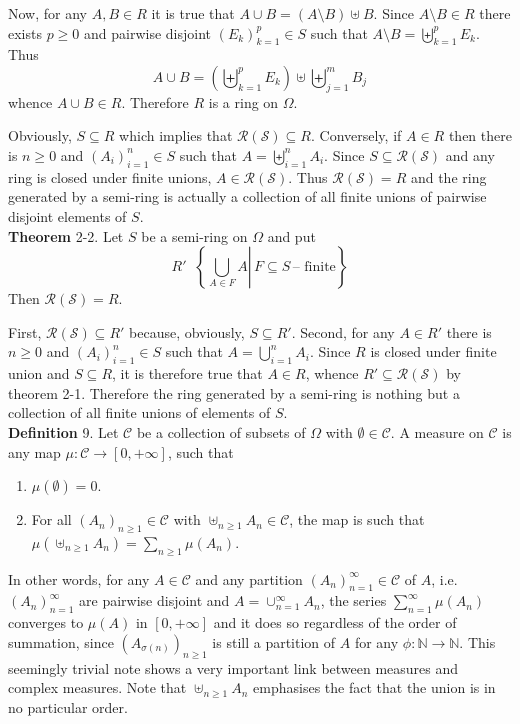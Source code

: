 \documentclass[a4paper]{article}
\newcommand{\obj}[1]{\left\{ #1 \right \}}
\newcommand{\clo}[1]{\left [ #1 \right ]}
\newcommand{\brac}[1]{\left ( #1 \right )}
\newcommand{\induc}[1]{\left . #1 \right \vert}
\newcommand{\Zinf}{\clo{ 0, +\infty }}
\newcommand{\Ccal}{\mathcal{C}}
\newcommand{\Scal}{\mathcal{S}}
\newcommand{\Ring}[1]{\mathcal{R}\brac{#1}}
\newcommand{\defn}{\mathop{\overset{\Delta}{=}}\nolimits}
\begin{document}
Now, for any $A,B\in R$ it is true that $A \cup B = \brac{A\setminus B} \uplus B$. Since $A\setminus B\in R$ there exists $p\geq 0$ and pairwise disjoint $\brac{E_k}_{k=1}^p\in S$ such that $A\setminus B = \biguplus_{k=1}^p E_k$. Thus \[A\cup B = \brac{\biguplus_{k=1}^p E_k }\uplus \biguplus_{j=1}^m B_j\] whence $A\cup B\in R$. Therefore $R$ is a ring on $\Omega$.

Obviously, $S\subseteq R$ which implies that $\Ring{\Scal}\subseteq R$. Conversely, if $A\in R$ then there is $n\geq0$ and $\brac{A_i}_{i=1}^n\in S$ such that $A=\biguplus_{i=1}^n A_i$. Since $S\subseteq \Ring{\Scal}$ and any ring is closed under finite unions, $A\in \Ring{\Scal}$. Thus $\Ring{\Scal} = R$ and the ring generated by a semi-ring is actually a collection of all finite unions of pairwise disjoint elements of $S$.\\

\label{thm:ring_semi_ring} \noindent \textbf{Theorem} 2-2.
Let $S$ be a semi-ring on $\Omega$ and put \[R'\defn \obj{ \induc{\bigcup_{A\in F} A}\, F\subseteq S\,\text{-- finite} }\] Then $\Ring{\Scal} = R$.

First, $\Ring{\Scal}\subseteq R'$ because, obviously, $S\subseteq R'$. Second, for any $A\in R'$ there is $n\geq0$ and $\brac{A_i}_{i=1}^n\in S$ such that $A=\bigcup_{i=1}^n A_i$. Since $R$ is closed under finite union and $S\subseteq R$, it is therefore true that $A\in R$, whence $R'\subseteq \Ring{\Scal}$ by theorem 2-1. Therefore the ring generated by a semi-ring is nothing but a collection of all finite unions of elements of $S$.\\

\noindent \textbf{Definition} 9.
Let $\Ccal$ be a collection of subsets of $\Omega$ with $\emptyset \in \Ccal$. A measure on $\Ccal$ is any map $\mu:\Ccal\to\Zinf$, such that\begin{enumerate}
	\item $\mu\brac{\emptyset} = 0$.
	\item For all $\brac{A_n}_{n\geq1}\in \Ccal$ with $\uplus_{n\geq 1} A_n\in \Ccal$, the map is such that $\mu\brac{\uplus_{n\geq 1} A_n} = \sum_{n\geq 1} \mu\brac{A_n}$.
\end{enumerate}

In other words, for any $A\in \Ccal$ and any partition $\brac{A_n}_{n=1}^\infty\in \Ccal$ of $A$, i.e. $\brac{A_n}_{n=1}^\infty$ are pairwise disjoint and $A = \cup_{n=1}^\infty A_n$, the series $\sum_{n=1}^\infty \mu\brac{A_n}$ converges to $\mu\brac{A}$ in $\Zinf$ and it does so regardless of the order of summation, since $\brac{A_{\sigma\brac{n}}}_{n\geq 1}$ is still a partition of $A$ for any $\phi:\mathbb{N}\to\mathbb{N}$. This seemingly trivial note shows a very important link between measures and complex measures. Note that $\uplus_{n\geq1} A_n$ emphasises the fact that the union is in no particular order.
\end{document}

